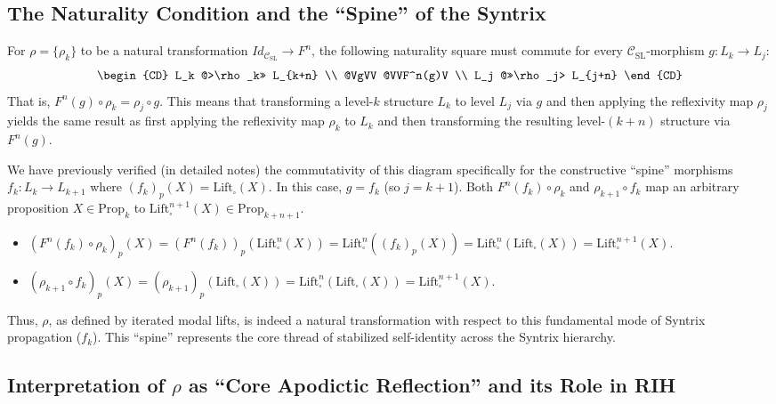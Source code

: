 \documentclass[
    12pt,              %
    a4paper,           %
    headings=normal,   %
    twoside=true,      %
    BCOR=8mm,          %
]{scrbook}
\newcommand{\q}[1]{\enquote{#1}}
\newcommand{\BoxSyn}{\square}
\begin{document}
\subsection{The Naturality Condition and the \q{Spine} of the Syntrix}
\label{sec:ch2_naturality_condition_spine} 

For \(\rho = \{\rho_k\}\) to be a natural transformation \(Id_{\mathcal{C}_{\text{SL}}} \to F^n\), the following naturality square must commute for every \(\mathcal{C}_{\text{SL}}\)-morphism \(g: L_k \to L_j\):
\[
\begin{CD}
L_k @>\rho_k>> L_{k+n} \\
@VgVV @VVF^n(g)V \\
L_j @>>\rho_j> L_{j+n}
\end{CD}
\]
That is, \( F^n(g) \circ \rho_k = \rho_j \circ g \). This means that transforming a level-\(k\) structure \(L_k\) to level \(L_j\) via \(g\) and then applying the reflexivity map \(\rho_j\) yields the same result as first applying the reflexivity map \(\rho_k\) to \(L_k\) and then transforming the resulting level-\((k+n)\) structure via \(F^n(g)\).

We have previously verified (in detailed notes) the commutativity of this diagram specifically for the constructive \q{spine} morphisms \(f_k: L_k \to L_{k+1}\) where \( (f_k)_p(X) = \text{Lift}_\BoxSyn(X) \). In this case, \(g = f_k\) (so \(j=k+1\)). Both \( F^n(f_k) \circ \rho_k \) and \( \rho_{k+1} \circ f_k \) map an arbitrary proposition \(X \in \text{Prop}_k\) to \(\text{Lift}_\BoxSyn^{n+1}(X) \in \text{Prop}_{k+n+1}\).
\begin{itemize}
    \item   \((F^n(f_k) \circ \rho_k)_p(X) = (F^n(f_k))_p(\text{Lift}_\BoxSyn^n(X)) = \text{Lift}_\BoxSyn^n((f_k)_p(X)) = \text{Lift}_\BoxSyn^n(\text{Lift}_\BoxSyn(X)) = \text{Lift}_\BoxSyn^{n+1}(X)\).
    \item   \((\rho_{k+1} \circ f_k)_p(X) = (\rho_{k+1})_p(\text{Lift}_\BoxSyn(X)) = \text{Lift}_\BoxSyn^n(\text{Lift}_\BoxSyn(X)) = \text{Lift}_\BoxSyn^{n+1}(X)\).
\end{itemize}
Thus, \(\rho\), as defined by iterated modal lifts, is indeed a natural transformation with respect to this fundamental mode of Syntrix propagation (\(f_k\)). This \q{spine} represents the core thread of stabilized self-identity across the Syntrix hierarchy.

\subsection{Interpretation of \(\rho\) as \q{Core Apodictic Reflection} and its Role in RIH}
\label{sec:ch2_interpretation_rho_rih} 
\end{document}
